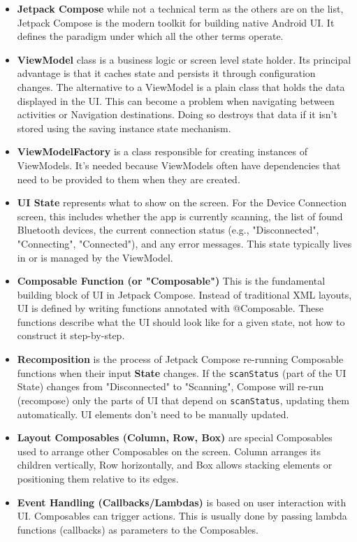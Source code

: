 \begin{itemize}
	\item \textbf{Jetpack Compose} while not a technical term as the others are on the list, Jetpack Compose is the modern toolkit for building native Android \ac{UI}. It defines the paradigm under which all the other terms operate.
	\item \textbf{ViewModel} class is a business logic or screen level state holder. Its principal advantage is that it caches state and persists it through configuration changes. The alternative to a ViewModel is a plain class that holds the data displayed in the \ac{UI}. This can become a problem when navigating between activities or Navigation destinations. Doing so destroys that data if it isn't stored using the saving instance state mechanism. 
	\item \textbf{ViewModelFactory} is a class responsible for creating instances of ViewModels. It's needed because ViewModels often have dependencies that need to be provided to them when they are created.
	\item \textbf{UI State} represents what to show on the screen. For the Device Connection screen, this includes whether the app is currently scanning, the list of found Bluetooth devices, the current connection status (e.g., "Disconnected", "Connecting", "Connected"), and any error messages. This state typically lives in or is managed by the ViewModel.
	\item \textbf{Composable Function (or "Composable")} This is the fundamental building block of \ac{UI} in Jetpack Compose. Instead of traditional XML layouts, \ac{UI} is defined by writing functions annotated with @Composable. These functions describe what the \ac{UI} should look like for a given state, not how to construct it step-by-step.
	\item \textbf{Recomposition} is the process of Jetpack Compose re-running Composable functions when their input \textbf{State} changes. If the \texttt{scanStatus} (part of the \ac{UI} State) changes from "Disconnected" to "Scanning", Compose will re-run (recompose) only the parts of \ac{UI} that depend on \texttt{scanStatus}, updating them automatically. \ac{UI} elements don't need to be manually updated.
	\item \textbf{Layout Composables (Column, Row, Box)} are special Composables used to arrange other Composables on the screen. Column arranges its children vertically, Row horizontally, and Box allows stacking elements or positioning them relative to its edges.
	\item \textbf{Event Handling (Callbacks/Lambdas)} is based on user interaction with \ac{UI}. Composables can trigger actions. This is usually done by passing lambda functions (callbacks) as parameters to the Composables.

\end{itemize}
